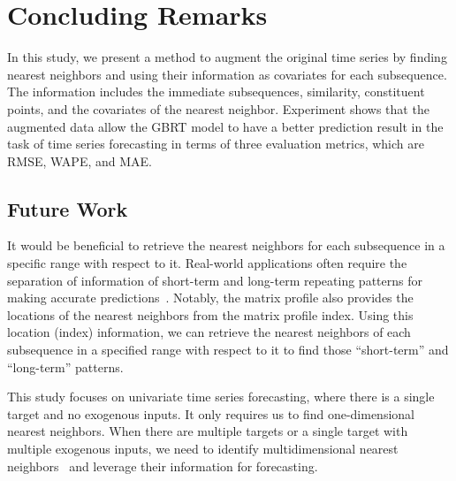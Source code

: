 \section{Concluding Remarks} \label{sec:conclusion}

In this study, we present a method to augment the original time series by finding nearest neighbors and using their information as covariates for each subsequence.
The information includes the immediate subsequences, similarity, constituent points, and the covariates of the nearest neighbor.
Experiment shows that the augmented data allow the GBRT model to have a better prediction result in the task of time series forecasting in terms of three evaluation metrics, which are RMSE, WAPE, and MAE.

\subsection{Future Work}

\noindent{}It would be beneficial to retrieve the nearest neighbors for each subsequence in a specific range with respect to it.
Real-world applications often require the separation of information of short-term and long-term repeating patterns for making accurate predictions~\cite {lai2018modeling}.
Notably, the matrix profile also provides the locations of the nearest neighbors from the matrix profile index. Using this location (index) information, we can retrieve the nearest neighbors of each subsequence in a specified range with respect to it to find those ``short-term'' and ``long-term'' patterns.

\noindent{}This study focuses on univariate time series forecasting, where there is a single target and no exogenous inputs. It only requires us to find one-dimensional nearest neighbors.
When there are multiple targets or a single target with multiple exogenous inputs, we need to identify multidimensional nearest neighbors~\cite{yeh2017matrixa} and leverage their information for forecasting.

